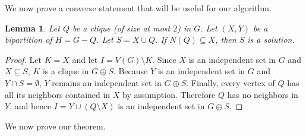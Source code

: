 \documentclass[11pt]{article}
\newtheorem{lemma}[theorem]{Lemma}
\theoremstyle{definition}
\begin{document}
We now prove a converse statement that will be useful for our algorithm.

\begin{lemma}
\label{lemma:bipartite-split-characterization-2}
Let $Q$ be a clique (of size at most $2$) in $G$.
Let $(X,Y)$ be a bipartition of $H=G-Q$. 
Let $S = X \cup Q$.  
If $N(Q) \subseteq X$, then $S$ is a solution.
\end{lemma}
\begin{proof}
Let $K = X$ and let $I = V(G)\setminus K$.
Since $X$ is an independent set in $G$ and $X \subseteq S$, $K$ is a clique in $G \oplus S$.
Because $Y$ is an independent set in $G$ and $Y \cap S = \emptyset$, $Y$ remains an independent set in $G \oplus S$.
Finally, every vertex of $Q$ has all its neighbors contained in $X$ by assumption.  
Therefore $Q$ has no neighbors in $Y$, and hence $I = Y \cup (Q\setminus X)$ is an independent set in $G \oplus S$.
\end{proof}
We now prove our theorem.
\end{document}
